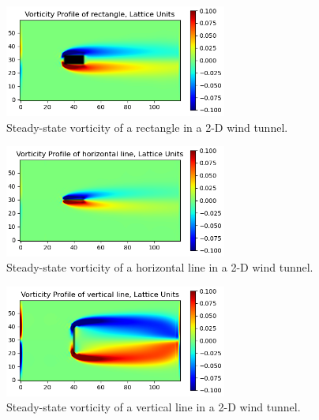 \documentclass[twoside]{article}
\begin{document}
\begin{centering}
\begin{figure}[H]
\centering
\graphicspath{ {stream_images/} }
\includegraphics[width=0.65\textwidth]{final_rectangle.png}
\captionsetup{format = hang, width = 0.8\textwidth}
\caption{Steady-state vorticity of a rectangle in a 2-D wind tunnel.}
\label{fig:FinalRectangle}
\end{figure}
\end{centering}

\begin{centering}
\begin{figure}[H]
\centering
\graphicspath{ {stream_images/} }
\includegraphics[width=0.65\textwidth]{final_horizontal.png}
\captionsetup{format = hang, width = 0.8\textwidth}
\caption{Steady-state vorticity of a horizontal line in a 2-D wind tunnel.}
\label{fig:FinalHorizontal}
\end{figure}
\end{centering}

\begin{centering}
\begin{figure}[H]
\centering
\graphicspath{ {stream_images/} }
\includegraphics[width=0.65\textwidth]{final_vertical.png}
\captionsetup{format = hang, width = 0.8\textwidth}
\caption{Steady-state vorticity of a vertical line in a 2-D wind tunnel.}
\label{fig:FinalVertical}
\end{figure}
\end{centering}
\end{document}
